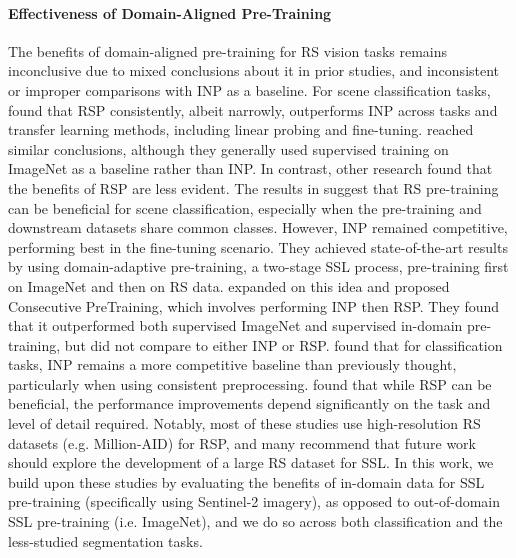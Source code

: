 \paragraph{Effectiveness of Domain-Aligned Pre-Training}
The benefits of domain-aligned pre-training for RS vision tasks remains inconclusive due to mixed conclusions about it in prior studies, and inconsistent or improper comparisons with INP as a baseline. For scene classification tasks, \cite{dimitrovski2024domain} found that RSP consistently, albeit narrowly, outperforms INP across tasks and transfer learning methods, including linear probing and fine-tuning. \cite{manas2021seasonal, wang2023ssl4eo, ayush2021geography} reached similar conclusions, although they generally used supervised  training on ImageNet as a baseline rather than INP. In contrast, other research found that the benefits of RSP are less evident. The results in \cite{isprs-archives-XLIII-B3-2022-1399-2022} suggest that RS pre-training can be beneficial for scene classification, especially when the pre-training and downstream datasets share common classes. However, INP remained competitive, performing best in the fine-tuning scenario. They achieved state-of-the-art results by using domain-adaptive pre-training, a two-stage SSL process, pre-training first on ImageNet and then on RS data. \cite{zhang2022consecutive} expanded on this idea and proposed Consecutive PreTraining, which involves performing INP then RSP. They found that it outperformed both supervised ImageNet and supervised in-domain pre-training, but did not compare to either INP or RSP. \cite{corley2024revisiting} found that for classification tasks, INP remains a more competitive baseline than previously thought, particularly when using consistent preprocessing. \cite{wang2022empirical} found that while RSP can be beneficial, the performance improvements depend significantly on the task and level of detail required. Notably, most of these studies use high-resolution RS datasets (e.g. Million-AID) for RSP, and many recommend that future work should explore the development of a large RS dataset for SSL. In this work, we build upon these studies by evaluating the benefits of in-domain data for SSL pre-training (specifically using Sentinel-2 imagery), as opposed to out-of-domain SSL pre-training (i.e. ImageNet), and we do so across both classification and the less-studied segmentation tasks.